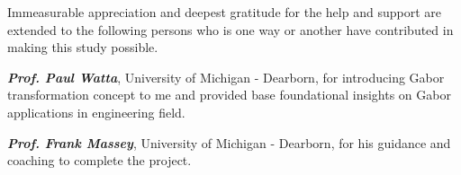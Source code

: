 Immeasurable appreciation and deepest gratitude for the help and support are extended to the following persons who is one way or another have contributed in making this study possible. 

\textbf \textsl{Prof. Paul Watta}, University of Michigan - Dearborn, for introducing Gabor transformation concept to me and provided base foundational insights on Gabor applications in engineering field. 

\textbf \textsl{Prof. Frank Massey}, University of Michigan - Dearborn, for his guidance and coaching to complete the project. 


